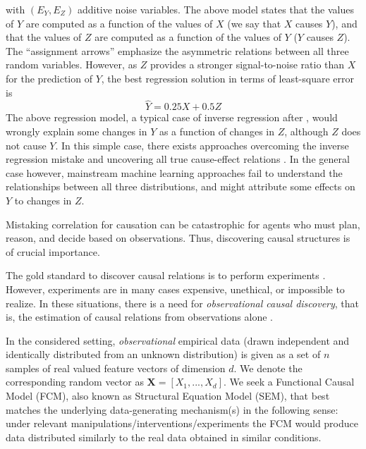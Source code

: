 \documentclass[a4paper, 11pt]{article}
\begin{document}
with $(E_Y, E_Z)$ additive noise variables. The above model states that the values of $Y$ are computed as a function of the values of $X$ (we say that $X$ causes $Y$), and that the
values of $Z$ are computed as a function of the values of $Y$ ($Y$ causes $Z$).  The
``assignment arrows'' emphasize the asymmetric relations between all three random variables.  However, as $Z$ provides a stronger signal-to-noise ratio than $X$ for the prediction of $Y$, the best regression solution in terms of least-square error is 
$$\hat{Y} = 0.25 X + 0.5 Z$$
The above regression model, a typical case of inverse regression
after \cite{goldberger1984reverse}, would
wrongly explain some changes in $Y$ as a function of changes in $Z$, although $Z$ does not cause $Y$. In this simple case, there exists approaches overcoming the inverse regression mistake and uncovering all true cause-effect
relations \citep{hoyer2009nonlinear}. In the general case however, mainstream machine learning approaches fail to understand the relationships between all three distributions, and might attribute some effects on $Y$ to changes in $Z$. 

Mistaking correlation for causation can be catastrophic for agents who must plan, reason, and decide based on observations.  Thus, discovering causal structures is 
of crucial importance. 


The gold standard to discover causal relations is to perform experiments
\citep{pearl2003causality}. However, experiments are in many cases expensive,
unethical, or impossible to realize. In these situations, there is a
need for \emph{observational causal discovery}, that is, the estimation of
causal relations from observations alone \citep{spirtes2000causation,
PetJanSch17}. 

In the considered setting, {\em observational} empirical data (drawn independent and identically distributed from an unknown distribution) is given as a set of $n$ samples of real valued feature vectors of dimension $d$. We denote the corresponding random vector as $\mathbf{X} = \left[X_1,..., X_d\right] $. 
We seek a Functional Causal Model (FCM), also known as Structural Equation Model (SEM), that best matches the underlying data-generating mechanism(s) in the following sense: under relevant manipulations/interventions/experiments the FCM would produce data distributed similarly to the real data obtained in similar conditions. 
\end{document}
